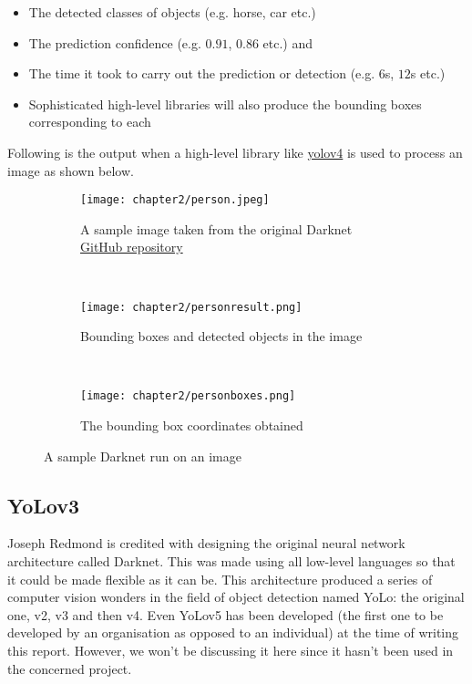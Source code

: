 \begin{itemize}
  \item The detected classes of objects (e.g. horse, car etc.)
  \item The prediction confidence (e.g. $0.91$, $0.86$ etc.) and
  \item The time it took to carry out the prediction or detection (e.g. $6$s, $12$s etc.)
  \item Sophisticated high-level libraries will also produce the bounding boxes corresponding to each
\end{itemize}

\vspace{-0.1in}

Following is the output when a high-level library like \href{https://pypi.org/project/yolov4/}{yolov4} is used to process an image as shown below.

\begin{figure}[h]

  \begin{center}
    \begin{subfigure}{0.7\textwidth}
      \texttt{[image: chapter2/person.jpeg]}
      \caption{A sample image taken from the original Darknet \href{https://github.com/AlexeyAB/darknet}{GitHub repository}}
      \label{fig:person_sub1}
    \end{subfigure} \\
    \begin{subfigure}{0.7\textwidth}
      \texttt{[image: chapter2/personresult.png]}
      \caption{Bounding boxes and detected objects in the image}
      \label{fig:person_sub2}
    \end{subfigure} \\
    \begin{subfigure}{0.7\textwidth}
      \texttt{[image: chapter2/personboxes.png]}
      \caption{The bounding box coordinates obtained}
      \label{fig:person_sub3}
    \end{subfigure}

    \caption{A sample Darknet run on an image}
    \label{fig:person_ref}

  \end{center}

\end{figure}



\subsection{YoLov3 \cite{yolov3}}
Joseph Redmond is credited with designing the original neural network architecture called Darknet. This was made using all low-level languages so that it could be made flexible as it can be. This architecture produced a series of computer vision wonders in the field of object detection named YoLo: the original one, v2, v3 and then v4. Even YoLov5 has been developed (the first one to be developed by an organisation as opposed to an individual) at the time of writing this report. However, we won’t be discussing it here since it hasn’t been used in the concerned project. \par

